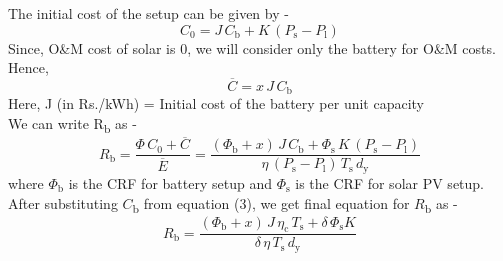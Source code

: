 \documentclass{article}
\newcommand{\Ebar}{\overline{E}}
\begin{document}
The initial cost of the setup can be given by - \\
\[
   C_\text{0} = J \, C_\text{b} + K \, (P_\text{s} - P_\text{l})
\]
Since, O\&M cost of solar is 0, we will consider only the battery for O\&M costs.\\
Hence,
\[
   \overline{C} = x \, J \, C_\text{b}
\]
Here, J (in Rs./kWh) = Initial cost of the battery per unit capacity\\
\newline
We can write R\textsubscript{b} as -\\
\[
   R_\text{b} = \frac{\Phi \, C_\text{0} +  \overline{C}}{\Ebar} = \frac{(\Phi_\text{b} + x) \, J \, C_\text{b} + \Phi_\text{s} \, K \, (P_\text{s} - P_\text{l})}{\eta \, (P_\text{s} - P_\text{l}) \, T_\text{s} \, d_\text{y}}
\]
where \(\Phi_\text{b}\) is the CRF for battery setup and \(\Phi_\text{s}\) is the CRF for solar PV setup.\\
After substituting \(C\)\textsubscript{b} from equation (3), we get final equation for \(R\)\textsubscript{b} as -\\
\begin{equation}
  R_\text{b} = \frac{(\Phi_\text{b} + x) \, J \, \eta_\text{c} \, T_\text{s} + \delta \, \Phi_\text{s} K}{\delta \, \eta \, T_\text{s} \, d_\text{y}}
\end{equation}
\end{document}
